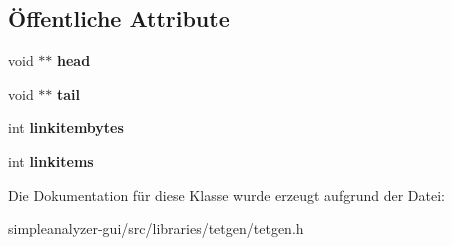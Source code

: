 \subsection*{Öffentliche Attribute}
\begin{DoxyCompactItemize}
\item 
\hypertarget{classtetgenmesh_1_1queue_a9ed42262f1e574b811e6fb5c1647f56d}{void $\ast$$\ast$ {\bfseries head}}\label{classtetgenmesh_1_1queue_a9ed42262f1e574b811e6fb5c1647f56d}

\item 
\hypertarget{classtetgenmesh_1_1queue_afa964c94b74fa497186c0bf1ea3eef98}{void $\ast$$\ast$ {\bfseries tail}}\label{classtetgenmesh_1_1queue_afa964c94b74fa497186c0bf1ea3eef98}

\item 
\hypertarget{classtetgenmesh_1_1queue_a2be43a9fff3837cfc54faea5f2813442}{int {\bfseries linkitembytes}}\label{classtetgenmesh_1_1queue_a2be43a9fff3837cfc54faea5f2813442}

\item 
\hypertarget{classtetgenmesh_1_1queue_a56dae24717089a6ff2b28caef1f16800}{int {\bfseries linkitems}}\label{classtetgenmesh_1_1queue_a56dae24717089a6ff2b28caef1f16800}

\end{DoxyCompactItemize}


Die Dokumentation für diese Klasse wurde erzeugt aufgrund der Datei\-:\begin{DoxyCompactItemize}
\item 
simpleanalyzer-\/gui/src/libraries/tetgen/tetgen.\-h\end{DoxyCompactItemize}
